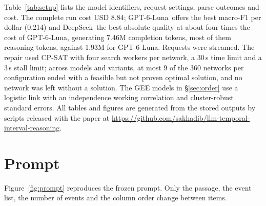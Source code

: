 \documentclass[11pt]{article}
\newcommand{\Ds}{DeepSeek}
\newcommand{\Gp}{GPT-6-Luna}
\begin{document}
Table~\ref{tab:setup} lists the model identifiers, request settings, parse outcomes and cost. The complete run cost USD 8.84; \Gp\ offers the best macro-F1 per dollar (0.214) and \Ds\ the best absolute quality at about four times the cost of \Gp, generating 7.46M completion tokens, most of them reasoning tokens, against 1.93M for \Gp. Requests were streamed. The repair used CP-SAT with four search workers per network, a 30\,s time limit and a 3\,s stall limit; across models and variants, at most 9 of the 360 networks per configuration ended with a feasible but not proven optimal solution, and no network was left without a solution. The GEE models in \S\ref{sec:order} use a logistic link with an independence working correlation and cluster-robust standard errors. All tables and figures are generated from the stored outputs by scripts released with the paper at \url{https://github.com/sakhadib/llm-temporal-interval-reasoning}.

\section{Prompt}
\label{app:prompt}

Figure~\ref{fig:prompt} reproduces the frozen prompt. Only the passage, the event list, the number of events and the column order change between items.
\end{document}
